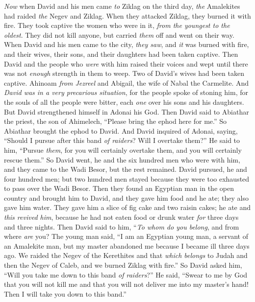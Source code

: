 \begin{biblechapter} %
 \textit{Now} when David and his men came \textit{to} Ziklag on the third day, \textit{the} Amalekites had raided \textit{the} Negev and Ziklag. When they attacked Ziklag, they burned it with fire.
\verse They took captive the women who were in it, \textit{from the youngest to the oldest}. They did not kill anyone, but carried \textit{them} off and went on their way.
\verse When David and his men came to the city, \textit{they saw}, and \textit{it} was burned with fire, and their wives, their sons, and their daughters had been taken captive.
\verse Then David and the people who \textit{were} with him raised their voices and wept until there was not \textit{enough} strength in them to weep.
\verse Two of David’s wives had been taken captive. Ahinoam \textit{from Jezreel} and Abigail, the wife of Nabal the Carmelite.
\verse And \textit{David was in a very precarious situation}, for the people spoke of stoning him, for the souls of all the people were bitter, each \textit{one} over his sons and his daughters. But David strengthened himself in Adonai his God.
\verse Then David said to Abiathar the priest, the son of Ahimelech, “Please bring the ephod here for me.” So Abiathar brought the ephod to David.
\verse And David inquired of Adonai, saying, “Should I pursue after this band \textit{of raiders}? Will I overtake them?” He said to him, “Pursue \textit{them}, for you will certainly overtake them, and you will certainly rescue them.”
\verse So David went, he and the six hundred men who were with him, and they came to the Wadi Besor, but the rest remained.
\verse David pursued, he and four hundred men; but two hundred men stayed because they were too exhausted to pass over the Wadi Besor.
\verse Then they found an Egyptian man in the open country and brought him to David, and they gave him food and he ate; they also gave him water.
\verse They gave him a slice of fig cake and two raisin cakes; he ate and \textit{this revived him}, because he had not eaten food or drunk water \textit{for} three days and three nights.
\verse Then David said to him, “\textit{To whom do you belong}, and from where \textit{are} you? The young man said, “I am an Egyptian young man, a servant of an Amalekite man, but my master abandoned me because I became ill three days ago.
\verse We raided the Negev of the Kerethites and that \textit{which belongs} to Judah and then the Negev of Caleb, and we burned Ziklag with fire.”
\verse So David asked him, “Will you take me down to this band \textit{of raiders}?” He said, “Swear to me by God that you will not kill me and that you will not deliver me into my master’s hand! Then I will take you down to this band.”

\end{biblechapter}

